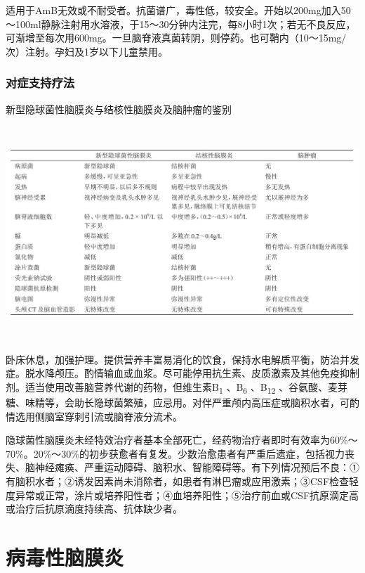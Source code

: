 适用于AmB无效或不耐受者。抗菌谱广，毒性低，较安全。开始以200mg加入50～100ml静脉注射用水溶液，于15～30分钟内注完，每8小时1次；若无不良反应，可渐增至每次用600mg。一旦脑脊液真菌转阴，则停药。也可鞘内（10～15mg/次）注射。孕妇及1岁以下儿童禁用。

\subsubsection{对症支持疗法}

\begin{table}[htbp]
\centering
\caption{新型隐球菌性脑膜炎与结核性脑膜炎及脑肿瘤的鉴别}
\label{tab86-1}
\includegraphics[width=6.66667in,height=3.16667in]{./images/Image00390.jpg}
\end{table}

卧床休息，加强护理。提供营养丰富易消化的饮食，保持水电解质平衡，防治并发症。脱水降颅压。酌情输血或血浆。尽可能停用抗生素、皮质激素及其他免疫抑制剂。适当使用改善脑营养代谢的药物，但维生素B\textsubscript{1}
、B\textsubscript{6} 、B\textsubscript{12}
、谷氨酸、麦芽糖、味精等，会助长隐球菌繁殖，应忌用。对伴严重颅内高压症或脑积水者，可酌情选用侧脑室穿刺引流或脑脊液分流术。

隐球菌性脑膜炎未经特效治疗者基本全部死亡，经药物治疗者即时有效率为60\%～70\%。20\%～30\%的初步获愈者有复发。少数治愈患者有严重后遗症，包括视力丧失、脑神经瘫痪、严重运动障碍、脑积水、智能障碍等。有下列情况预后不良：①有脑积水者；②诱发因素尚未消除者，如患者有淋巴瘤或应用激素；③CSF检查轻度异常或正常，涂片或培养阳性者；④血培养阳性；⑤治疗前血或CSF抗原滴定高或治疗后抗原滴度持续高、抗体缺少者。

\protect\hypertarget{text00250.html}{}{}

\section{病毒性脑膜炎}

